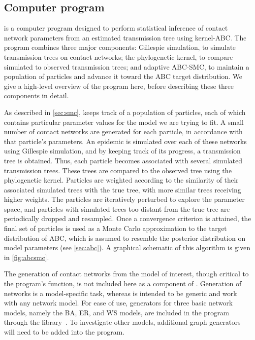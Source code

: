 \subsection{Computer program}

 is a computer program designed to perform statistical
inference of contact network parameters from an estimated transmission tree
using kernel-\gls{ABC}. The program combines three major components: Gillespie
simulation, to simulate transmission trees on contact networks; the
phylogenetic kernel, to compare simulated to observed transmission trees; and
adaptive \gls{ABC}-\gls{SMC}, to maintain a population of particles and
advance it toward the \gls{ABC} target distribution. We give a high-level
overview of the program here, before describing these three components in
detail.

As described in \cref{sec:smc},  keeps track of a population
of particles, each of which contains particular parameter values for the model
we are trying to fit. A small number of contact networks are generated for each
particle, in accordance with that particle's parameters. An epidemic is
simulated over each of these networks using Gillespie simulation, and by
keeping track of its progress, a transmission tree is obtained. Thus, each
particle becomes associated with several simulated transmission trees.  These
trees are compared to the observed tree using the phylogenetic kernel.
Particles are weighted according to the similarity of their associated
simulated trees with the true tree, with more similar trees receiving higher
weights. The particles are iteratively perturbed to explore the parameter
space, and particles with simulated trees too distant from the true tree are
periodically dropped and resampled. Once a convergence criterion is attained,
the final set of particles is used as a Monte Carlo approximation to the target
distribution of \gls{ABC}, which is assumed to resemble the posterior
distribution on model parameters (see \cref{sec:abc}). A graphical schematic of
this algorithm is given in \cref{fig:abcsmc}.

The generation of contact networks from the model of interest, though critical
to the program's function, is not included here as a component of
.  Generation of networks is a model-specific task, whereas
 is intended to be generic and work with any network model.
For ease of use, generators for three basic network models, namely the
\gls{BA}, \gls{ER}, and \gls{WS} models, are included in the program through
the  library~\autocite{csardi2006igraph}. To investigate other
models, additional graph generators will need to be added into the program.

